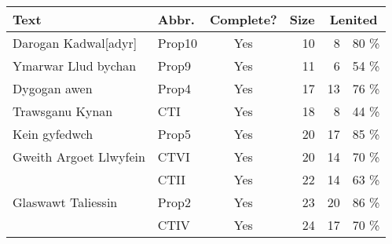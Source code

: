 \begin{table}[]
\centering
\begin{tabular}{@{}llcrrr@{}}
\toprule
\textbf{Text}                     & \textbf{Abbr.} & \multicolumn{1}{l}{\textbf{Complete?}} & \multicolumn{1}{l}{\textbf{Size}} & \multicolumn{2}{c}{\textbf{Lenited}} \\ \midrule
Darogan Kadwal{[}adyr{]}          & Prop10         & Yes                                      & 10                                       & 8                                    & 80                                   \% \\
Ymarwar Llud bychan               & Prop9          & Yes                                      & 11                                       & 6                                    & 54                                   \% \\
Dygogan awen                      & Prop4          & Yes                                      & 17                                       & 13                                   & 76                                   \% \\
Trawsganu Kynan                   & CTI            & Yes                                      & 18                                       & 8                                    & 44                                   \% \\
Kein gyfedwch                     & Prop5          & Yes                                      & 20                                       & 17                                   & 85                                   \% \\
Gweith Argoet Llwyfein            & CTVI           & Yes                                      & 20                                       & 14                                   & 70                                   \% \\
                                  & CTII           & Yes                                      & 22                                       & 14                                   & 63                                   \% \\
Glaswawt Taliessin                & Prop2          & Yes                                      & 23                                       & 20                                   & 86                                   \% \\
                                  & CTIV           & Yes                                      & 24                                       & 17                                   & 70                                   \% \\

\end{tabular}
\end{table}
